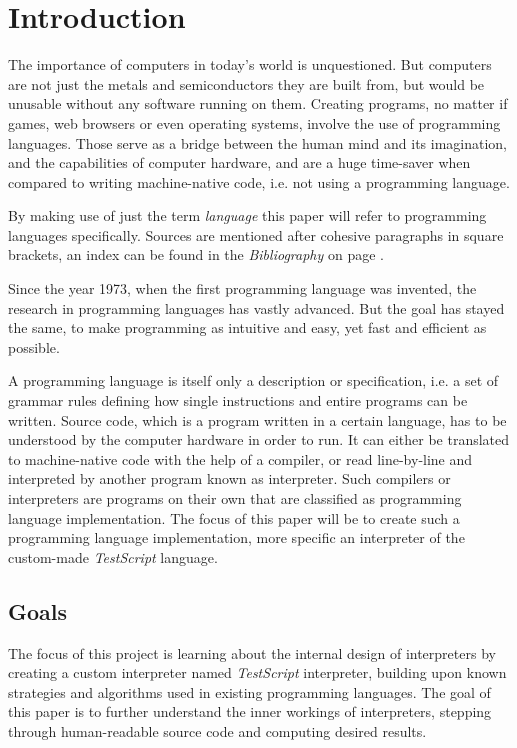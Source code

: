 \documentclass[12pt,a4paper]{article}
\newcommand{\name}{\emph{TestScript}}
\begin{document}
\section{Introduction}
The importance of computers in today's world is unquestioned.
But computers are not just the metals and semiconductors they are built from,
but would be unusable without any software running on them.
Creating programs, no matter if games, web browsers or even operating systems,
involve the use of programming languages.
Those serve as a bridge between the human mind and its imagination, and
the capabilities of computer hardware, and are a huge time-saver when compared
to writing machine-native code, i.e. not using a programming language.

By making use of just the term \emph{language} this paper will refer to programming
languages specifically. Sources are mentioned after cohesive paragraphs in
square brackets, an index can be found in the \emph{Bibliography} on page
\pageref{bibliography}.

Since the year 1973, when the first programming language was invented, the
research in programming languages has vastly advanced. But the goal has stayed
the same, to make programming as intuitive and easy, yet fast and efficient as
possible.

A programming language is itself only a description or specification, i.e. a
set of grammar rules defining how single instructions and entire programs
can be written. Source code, which is a program written in a certain language,
has to be understood by the computer hardware in order to run. It can either
be translated to machine-native code with the help of a compiler, or
read line-by-line and interpreted by another program known as interpreter.
Such compilers or interpreters are programs on their own that are classified
as programming language implementation. The focus of this paper will be to
create such a programming language implementation, more specific an interpreter
of the custom-made \name{} language.

\subsection{Goals}
The focus of this project is learning about the internal design of interpreters
by creating a custom interpreter named \name{} interpreter, building upon
known strategies and algorithms used in existing programming languages.
The goal of this paper is to further understand the inner workings of
interpreters, stepping through human-readable source code and computing
desired results.
\end{document}
